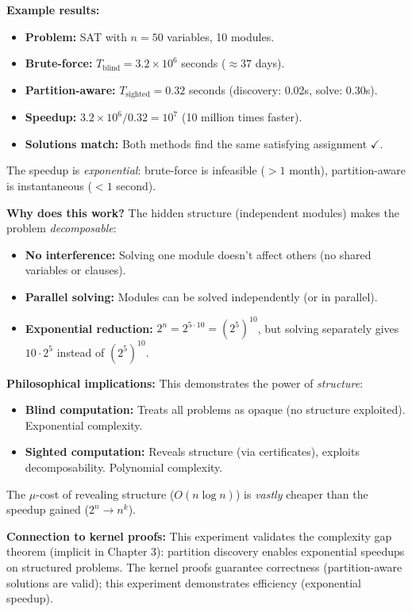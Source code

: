 \textbf{Example results:}
\begin{itemize}
    \item \textbf{Problem:} SAT with $n = 50$ variables, 10 modules.
    \item \textbf{Brute-force:} $T_{\text{blind}} = 3.2 \times 10^{6}$ seconds ($\approx 37$ days).
    \item \textbf{Partition-aware:} $T_{\text{sighted}} = 0.32$ seconds (discovery: 0.02s, solve: 0.30s).
    \item \textbf{Speedup:} $3.2 \times 10^{6} / 0.32 = 10^{7}$ (10 million times faster).
    \item \textbf{Solutions match:} Both methods find the same satisfying assignment $\checkmark$.
\end{itemize}
The speedup is \textit{exponential}: brute-force is infeasible ($> 1$ month), partition-aware is instantaneous ($< 1$ second).

\textbf{Why does this work?} The hidden structure (independent modules) makes the problem \textit{decomposable}:
\begin{itemize}
    \item \textbf{No interference:} Solving one module doesn't affect others (no shared variables or clauses).
    \item \textbf{Parallel solving:} Modules can be solved independently (or in parallel).
    \item \textbf{Exponential reduction:} $2^n = 2^{5 \cdot 10} = (2^5)^{10}$, but solving separately gives $10 \cdot 2^5$ instead of $(2^5)^{10}$.
\end{itemize}

\textbf{Philosophical implications:} This demonstrates the power of \textit{structure}:
\begin{itemize}
    \item \textbf{Blind computation:} Treats all problems as opaque (no structure exploited). Exponential complexity.
    \item \textbf{Sighted computation:} Reveals structure (via certificates), exploits decomposability. Polynomial complexity.
\end{itemize}
The $\mu$-cost of revealing structure ($O(n \log n)$) is \textit{vastly} cheaper than the speedup gained ($2^n \to n^k$).

\textbf{Connection to kernel proofs:} This experiment validates the complexity gap theorem (implicit in Chapter 3): partition discovery enables exponential speedups on structured problems. The kernel proofs guarantee correctness (partition-aware solutions are valid); this experiment demonstrates efficiency (exponential speedup).


